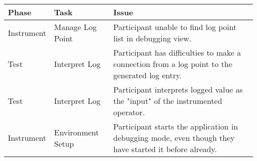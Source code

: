 \begin{table}[]
\begin{tabular}{|l|l|l|}
\hline
Phase      & Task              & Issue                                                                                                  \\ \hline
Instrument & Manage Log Point  & Participant unable to find log point list in debugging view.                                           \\ \hline
Test       & Interpret Log     & Participant has difficulties to make a connection from a log point to the generated log entry.         \\ \hline
Test       & Interpret Log     & Participant interprets logged value as the "input" of the instrumented operator.                       \\ \hline
Instrument & Environment Setup & Participant starts the application in debugging mode, even though they have started it before already. \\ \hline
\end{tabular}
\end{table}